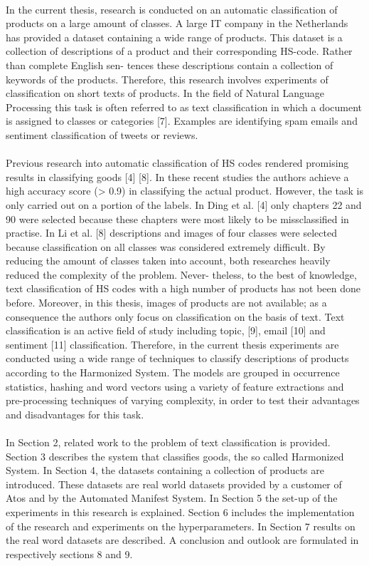 \\
In the current thesis, research is conducted on an automatic classification of products on a large amount of classes. A large IT company in the Netherlands has provided a dataset containing a wide range of products. This dataset is a collection of descriptions of a product and their corresponding HS-code. Rather than complete English sen- tences these descriptions contain a collection of keywords of the products. Therefore, this research involves experiments of classification on short texts of products. In the field of Natural Language Processing this task is often referred to as text classification in which a document is assigned to classes or categories [7]. Examples are identifying spam emails and sentiment classification of tweets or reviews.\\
\\
Previous research into automatic classification of HS codes rendered promising results in classifying goods [4] [8]. In these recent studies the authors achieve a high accuracy score (> 0.9) in classifying the actual product. However, the task is only carried out on a portion of the labels. In Ding et al. [4] only chapters 22 and 90 were selected because these chapters were most likely to be missclassified in practise. In Li et al. [8] descriptions and images of four classes were selected because classification on all classes was considered extremely difficult. By reducing the amount of classes taken into account, both researches heavily reduced the complexity of the problem. Never- theless, to the best of knowledge, text classification of HS codes with a high number of products has not been done before. Moreover, in this thesis, images of products are not available; as a consequence the authors only focus on classification on the basis of text. Text classification is an active field of study including topic, [9], email [10] and sentiment [11] classification. Therefore, in the current thesis experiments are conducted using a wide range of techniques to classify descriptions of products according to the Harmonized System. The models are grouped in occurrence statistics, hashing and word vectors using a variety of feature extractions and pre-processing techniques of varying complexity, in order to test their advantages and disadvantages for this task.
\\
\\
In Section 2, related work to the problem of text classification is provided. Section 3 describes the system that classifies goods, the so called Harmonized System. In Section 4, the datasets containing a collection of products are introduced. These datasets are real world datasets provided by a customer of Atos and by the Automated Manifest System. In Section 5 the set-up of the experiments in this research is explained. Section 6 includes the implementation of the research and experiments on the hyperparameters. In Section 7 results on the real word datasets are described. A conclusion and outlook are formulated in respectively sections 8 and 9.


